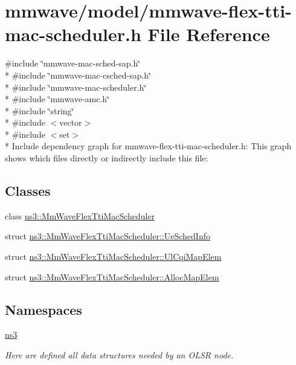 \hypertarget{mmwave-flex-tti-mac-scheduler_8h}{}\section{mmwave/model/mmwave-\/flex-\/tti-\/mac-\/scheduler.h File Reference}
\label{mmwave-flex-tti-mac-scheduler_8h}
{\ttfamily \#include \char`\"{}mmwave-\/mac-\/sched-\/sap.\+h\char`\"{}}\\*
{\ttfamily \#include \char`\"{}mmwave-\/mac-\/csched-\/sap.\+h\char`\"{}}\\*
{\ttfamily \#include \char`\"{}mmwave-\/mac-\/scheduler.\+h\char`\"{}}\\*
{\ttfamily \#include \char`\"{}mmwave-\/amc.\+h\char`\"{}}\\*
{\ttfamily \#include \char`\"{}string\char`\"{}}\\*
{\ttfamily \#include $<$vector$>$}\\*
{\ttfamily \#include $<$set$>$}\\*
Include dependency graph for mmwave-\/flex-\/tti-\/mac-\/scheduler.h\+:
This graph shows which files directly or indirectly include this file\+:
\subsection*{Classes}
\begin{DoxyCompactItemize}
\item 
class \hyperlink{classns3_1_1MmWaveFlexTtiMacScheduler}{ns3\+::\+Mm\+Wave\+Flex\+Tti\+Mac\+Scheduler}
\item 
struct \hyperlink{structns3_1_1MmWaveFlexTtiMacScheduler_1_1UeSchedInfo}{ns3\+::\+Mm\+Wave\+Flex\+Tti\+Mac\+Scheduler\+::\+Ue\+Sched\+Info}
\item 
struct \hyperlink{structns3_1_1MmWaveFlexTtiMacScheduler_1_1UlCqiMapElem}{ns3\+::\+Mm\+Wave\+Flex\+Tti\+Mac\+Scheduler\+::\+Ul\+Cqi\+Map\+Elem}
\item 
struct \hyperlink{structns3_1_1MmWaveFlexTtiMacScheduler_1_1AllocMapElem}{ns3\+::\+Mm\+Wave\+Flex\+Tti\+Mac\+Scheduler\+::\+Alloc\+Map\+Elem}
\end{DoxyCompactItemize}
\subsection*{Namespaces}
\begin{DoxyCompactItemize}
\item 
 \hyperlink{namespacens3}{ns3}
\begin{DoxyCompactList}\small\item\em Here are defined all data structures needed by an O\+L\+SR node. \end{DoxyCompactList}\end{DoxyCompactItemize}
